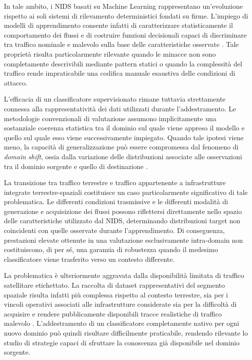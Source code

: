 In tale ambito, i NIDS basati su Machine Learning rappresentano un'evoluzione rispetto ai soli sistemi di rilevamento deterministici fondati su firme. 
L'impiego di modelli di apprendimento consente infatti di caratterizzare statisticamente il comportamento dei flussi e di costruire funzioni decisionali capaci di discriminare tra traffico nominale e malevolo sulla base delle caratteristiche osservate \cite{khraisat2019,hindy2020}. 
Tale proprietà risulta particolarmente rilevante quando le minacce non sono completamente descrivibili mediante pattern statici o quando la complessità del traffico rende impraticabile una codifica manuale esaustiva delle condizioni di attacco.

L'efficacia di un classificatore supervisionato rimane tuttavia strettamente connessa alla rappresentatività dei dati utilizzati durante l'addestramento. 
Le metodologie convenzionali di valutazione assumono implicitamente una sostanziale coerenza statistica tra il dominio sul quale viene appreso il modello e quello sul quale esso viene successivamente impiegato. 
Quando tale ipotesi viene meno, la capacità di generalizzazione può essere compromessa dal fenomeno di \textit{domain shift}, ossia dalla variazione delle distribuzioni associate alle osservazioni tra il dominio sorgente e quello di destinazione \cite{pan2010}.

La transizione tra traffico terrestre e traffico appartenente a infrastrutture integrate terrestre-spaziali costituisce un caso particolarmente significativo di tale problematica. 
Le differenti condizioni trasmissive e le differenti modalità di generazione e acquisizione dei flussi possono riflettersi direttamente nello spazio delle caratteristiche utilizzato dal NIDS, determinando distribuzioni target non coincidenti con quelle osservate durante l'apprendimento. 
Di conseguenza, prestazioni elevate ottenute in una valutazione esclusivamente intra-domain non costituiscono, di per sé, una garanzia di robustezza quando il medesimo classificatore viene trasferito verso un contesto differente.

La problematica è ulteriormente aggravata dalla disponibilità limitata di traffico satellitare etichettato. 
La raccolta di dataset rappresentativi del segmento spaziale risulta infatti più complessa rispetto al contesto terrestre, sia per i vincoli operativi associati alle infrastrutture considerate sia per la difficoltà di acquisire e rendere pubblicamente disponibili tracce realistiche di traffico malevolo \cite{kodheli2021,azar2023}. 
L'addestramento di un classificatore completamente nativo per ogni nuovo dominio può quindi risultare difficilmente praticabile, rendendo rilevante lo studio di strategie capaci di sfruttare la conoscenza già disponibile nel dominio sorgente.

